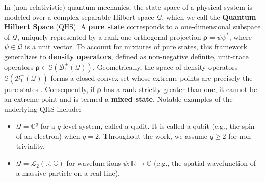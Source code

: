 \documentclass[noinfoline]{imsart}\setcounter{tocdepth}{2}
\renewcommand{\b}[1]{\mathbb{#1}} %
\renewcommand{\c}[1]{\mathcal{#1}} %
\newcommand{\mb}[1]{\boldsymbol{#1}} %
\theoremstyle{plain}
\begin{document}
In (non-relativistic) quantum mechanics, the state space of a physical system is modeled over a complex separable Hilbert space $\c{Q}$, which we call the \textbf{Quantum Hilbert Space} (QHS). A \textbf{pure state} corresponds to a one-dimensional subspace of $\c{Q}$, uniquely represented by a rank-one orthogonal projection $\mb{\rho} = \psi \psi^{*}$, where $\psi \in \c{Q}$ is a unit vector. 
To account for mixtures of pure states, this framework generalizes to \textbf{density operators}, defined as non-negative definite, unit-trace operators $\mb{\rho} \in \b{S}(\c{B}_{1}^{+}(\c{Q}))$. Geometrically, the space of density operators $\b{S}(\c{B}_{1}^{+}(\c{Q}))$ forms a closed convex set whose extreme points are precisely the pure states \cite{holevo2011probabilistic}. Consequently, if $\mb{\rho}$ has a rank strictly greater than one, it cannot be an extreme point and is termed a \textbf{mixed state}. Notable examples of the underlying QHS include:
\begin{itemize}[leftmargin = *]
    \item $\c{Q} = \b{C}^{q}$ for a $q$-level system, called a qudit. It is called a qubit (e.g., the spin of an electron) when $q=2$. Throughout the work, we assume $q \ge 2$ for non-triviality.
    \item $\c{Q} = \c{L}_{2}(\b{R}, \b{C})$ for wavefunctions $\psi: \b{R} \to \b{C}$ (e.g., the spatial wavefunction of a massive particle on a real line).
\end{itemize}
\end{document}
